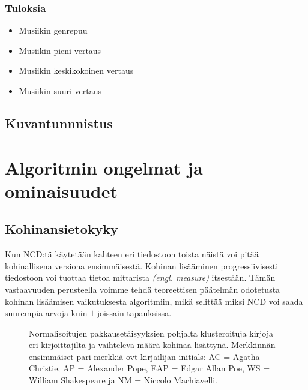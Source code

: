 \documentclass[12pt,finnish]{tktltiki2}
\theoremstyle{definition}
\theoremstyle{remark}
\newcommand{\engl}[1]{\emph{(engl. #1)}}
\begin{document}
    \subsubsection{Tuloksia} %
    \label{ssub:tuloksia}
      \begin{itemize}
        \item Musiikin genrepuu
        \item Musiikin pieni vertaus
        \item Musiikin keskikokoinen vertaus
        \item Musiikin suuri vertaus
      \end{itemize}

  \subsection{Kuvantunnnistus} %
  \label{sub:kuvantunnnistus}


\section{Algoritmin ongelmat ja ominaisuudet} %
\label{sec:algoritmin_ongelmat_ja_ominaisuudet}
  \subsection{Kohinansietokyky} %
  \label{sub:kohinansietokyky}

    Kun NCD:tä käytetään kahteen eri tiedostoon toista näistä voi pitää kohinallisena versiona ensimmäisestä.
    Kohinan lisääminen progressiivisesti tiedostoon voi tuottaa tietoa mittarista \engl{measure} itsestään.
    Tämän vastaavuuden perusteella voimme tehdä teoreettisen päätelmän odotetusta kohinan lisäämisen vaikutuksesta algoritmiin, mikä selittää miksi NCD voi saada suurempia arvoja kuin $1$ joissain tapauksissa. \cite{4167725}

    \begin{figure}
      \begin{center}
      \end{center}
      \caption{Normalisoitujen pakkausetäisyyksien pohjalta klusteroituja kirjoja eri kirjoittajilta ja vaihteleva määrä kohinaa lisättynä. Merkkinnän ensimmäiset pari merkkiä ovt kirjailijan initials: AC = Agatha Christie, AP = Alexander Pope, EAP = Edgar Allan Poe, WS = William Shakespeare ja NM = Niccolo Machiavelli.
      \cite{4167725}}
      \label{fig:(bzip2-best)}
    \end{figure}
\end{document}
